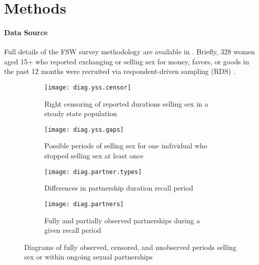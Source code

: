 \section{Methods}\label{meth}
\paragraph{Data Source}
Full details of the FSW survey methodology are available in \cite{Yam2013}.
Briefly, 328 women aged 15+
who reported exchanging or selling sex for money, favors, or goods in the past 12 months
were recruited via respondent-driven sampling (RDS) \cite{Heckathorn1997}.
\begin{figure}
  \begin{subfigure}[b]{\textwidth}
    \centering\texttt{[image: diag.yss.censor]}
    \caption{Right censoring of reported durations selling sex in a steady state population}
    \label{fig:diag.yss.censor}
  \end{subfigure}
  \begin{subfigure}[b]{\textwidth}
    \centering\texttt{[image: diag.yss.gaps]}
    \caption{Possible periods of selling sex for one individual who stopped selling sex at least once}
    \label{fig:diag.yss.gaps}
  \end{subfigure}
  \begin{subfigure}[b]{\textwidth}
    \centering\texttt{[image: diag.partner.types]}
    \caption{Differences in partnership duration \vs recall period}
    \label{fig:diag.partner.types}
  \end{subfigure}
  \begin{subfigure}[b]{\textwidth}
    \centering\texttt{[image: diag.partners]}
    \caption{Fully and partially observed partnerships during a given recall period}
    \label{fig:diag.partners}
  \end{subfigure}
  \caption{Diagrams of fully observed, censored, and unobserved periods
    selling sex or within ongoing sexual partnerships}
  \label{fig:diag}
\end{figure}
